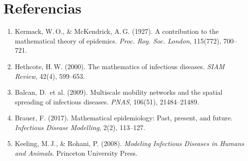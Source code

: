 \documentclass[12pt,a4paper]{article}
\begin{document}
\section{Referencias}
\begin{enumerate}
    \item Kermack, W.\,O., \& McKendrick, A.\,G. (1927). A contribution to the mathematical
          theory of epidemics. \textit{Proc. Roy. Soc. London}, 115(772), 700–721.
    \item Hethcote, H.\,W. (2000). The mathematics of infectious diseases.
          \textit{SIAM Review}, 42(4), 599–653.
    \item Balcan, D.\ et al. (2009). Multiscale mobility networks and the spatial
          spreading of infectious diseases. \textit{PNAS}, 106(51), 21484–21489.
    \item Brauer, F. (2017). Mathematical epidemiology: Past, present, and future.
          \textit{Infectious Disease Modelling}, 2(2), 113–127.
    \item Keeling, M.\,J., \& Rohani, P. (2008). \textit{Modeling Infectious Diseases
          in Humans and Animals}. Princeton University Press.
\end{enumerate}
\end{document}

